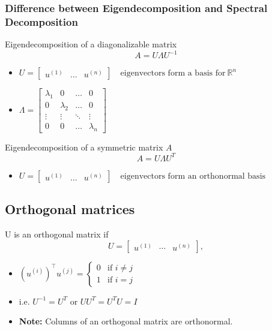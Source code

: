 \subsubsection{Difference between Eigendecomposition and Spectral Decomposition}
\begin{definition}
    Eigendecomposition of a diagonalizable matrix
    \[
    A = U \Lambda U^{-1}
    \]
    \begin{itemize}
        \item $U = \begin{bmatrix}
    u^{(1)} & \dots & u^{(n)}
    \end{bmatrix}
    \quad \text{eigenvectors form a basis for} \ \mathbb{R}^n$
    \item $\Lambda = \begin{bmatrix}
    \lambda_1 & 0 & \dots & 0 \\
    0 & \lambda_2 & \dots & 0 \\
    \vdots & \vdots & \ddots & \vdots \\
    0 & 0 & \dots & \lambda_n
    \end{bmatrix}$
    \end{itemize}
    \vspace{1em}

    Eigendecomposition of a symmetric matrix $A$
    \[
    A = U \Lambda U^T
    \]
    \begin{itemize}
        \item $U = \begin{bmatrix}
            u^{(1)} & \dots & u^{(n)}
            \end{bmatrix}
            \quad \text{eigenvectors form an orthonormal basis}$
    \end{itemize}  
\end{definition}

\subsection{Orthogonal matrices}
\begin{definition}
    U is an orthogonal matrix if
    \[
    U = \begin{bmatrix}
    u^{(1)} & \cdots & u^{(n)}
    \end{bmatrix},
    \]
    \begin{itemize}
        \item $
    (u^{(i)})^\top u^{(j)} = 
    \begin{cases} 
    0 & \text{if } i \neq j \\
    1 & \text{if } i = j
    \end{cases}$
    \item i.e. $U^{-1} = U^T$ or $UU^T = U^T U = I$
    \item \textbf{Note:} Columns of an orthogonal matrix are orthonormal.
    \end{itemize}
\end{definition}

